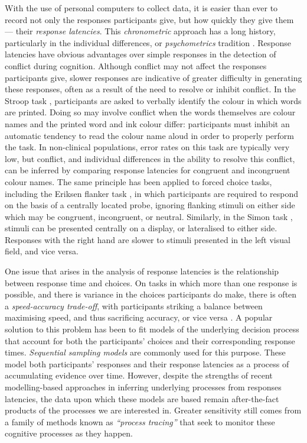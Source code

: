 With the use of personal computers to collect data,
it is easier than ever to record
not only the responses participants give,
but how quickly they give them --- their \emph{response latencies}.
This \emph{chronometric} approach has a long history,
particularly in the individual differences, or \emph{psychometrics} tradition 
\citep[see][for reviews]{Posner1978, Meyer1988}.
Response latencies have obvious advantages over simple responses
in the detection of conflict during cognition.
Although conflict may not affect the responses participants give,
slower responses are indicative of greater difficulty
in generating these responses,
often as a result of the need to resolve or inhibit conflict.
In the Stroop task \citep{Stroop1935},
participants are asked to verbally identify the colour in which words are printed.
Doing so may involve conflict when
the words themselves are colour names
and the printed word and ink colour differ:
participants must inhibit an automatic tendency
to read the colour name aloud
in order to properly perform the task.
In non-clinical populations,
error rates on this task are typically very low,
but conflict, and individual differences in the ability to resolve this conflict,
can be inferred by comparing response latencies
for congruent and incongruent colour names.
The same principle has been applied to forced choice tasks,
including the Eriksen flanker task \citep{Eriksen1974},
in which participants are required to respond
on the basis of a centrally located probe,
ignoring flanking stimuli on either side
which may be congruent, incongruent, or neutral.
Similarly, in the Simon task \citep{Simon1963},
stimuli can be presented centrally on a display,
or lateralised to either side.
Responses with the right hand are slower
to stimuli presented in the left visual field,
and vice versa.

One issue that arises in the analysis of response latencies
is the relationship between response time and choices.
On tasks in which more than one response is possible,
and there is variance in the choices participants do make,
there is often a \emph{speed-accuracy trade-off},
with participants striking a balance between
maximising speed, and thus sacrificing accuracy,
or vice versa \citep{Garrett1922}.
A popular solution to this problem has been to
fit models of the underlying decision process
that account for both the participants' choices
and their corresponding response times.
\emph{Sequential sampling models}
\citep{Ratcliff1978,Ratcliff2008a,Busemeyer1993,Hawkins2015}
are commonly used for this purpose.
These model both participants' responses
and their response latencies
as a process of accumulating evidence over time.
However, despite the strengths of recent modelling-based approaches
in inferring underlying processes from responses latencies,
the data upon which these models are based
remain after-the-fact products of the processes we are interested in.
Greater sensitivity still comes from a family of methods
known as \emph{``process tracing''} that seek to monitor
these cognitive processes as they happen.






